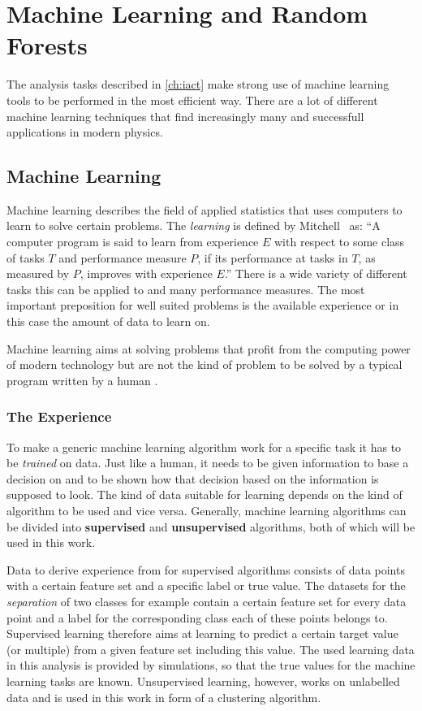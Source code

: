 \chapter{Machine Learning and Random Forests}
\label{ch:ML}
%
The analysis tasks described in \autoref{ch:iact} make strong use of machine
learning tools to be performed in the most efficient way. There are a lot of
different machine learning techniques that find increasingly many and
successfull applications in modern physics.

\section{Machine Learning}
%
Machine learning describes the field of applied statistics that uses computers to learn to solve certain problems. The \textit{learning} is defined by Mitchell~\cite{mitchell} as: \enquote{A computer program is said to learn from experience $E$ with respect to some class of tasks $T$ and performance measure $P$, if its performance at tasks in $T$, as measured by $P$, improves with experience $E$.} There is a wide variety of different tasks this can be applied to and many performance measures. The most important preposition for well suited problems is the available experience or in this case the amount of data to learn on.

Machine learning aims at solving problems that profit from the computing power
of modern technology but are not the kind of problem to be solved by a typical
program written by a human \cite{goodfellow}.

\subsection{The Experience}
%
To make a generic machine learning algorithm work for a specific task it has to
be \textit{trained} on data. Just like a human, it needs to be given
information to base a decision on and to be shown how that decision based on
the information is supposed to look. The kind of data suitable for learning
depends on the kind of algorithm to be used and vice versa. Generally, machine
learning algorithms can be divided into \textbf{supervised} and
\textbf{unsupervised} algorithms, both of which will be used in this work.

Data to derive experience from for supervised algorithms consists of data points
with a certain feature set and a specific label or true value. The datasets for
the \textit{separation} of two classes for example contain a certain feature
set for every data point and a label for the corresponding class each of these
points belongs to. Supervised learning therefore aims at learning to predict
a certain target value (or multiple) from a given feature set including this
value. The used learning data in this analysis is provided by simulations, so
that the true values for the machine learning tasks are known. Unsupervised
learning, however, works on unlabelled data and is used in this work in form of
a clustering algorithm.

